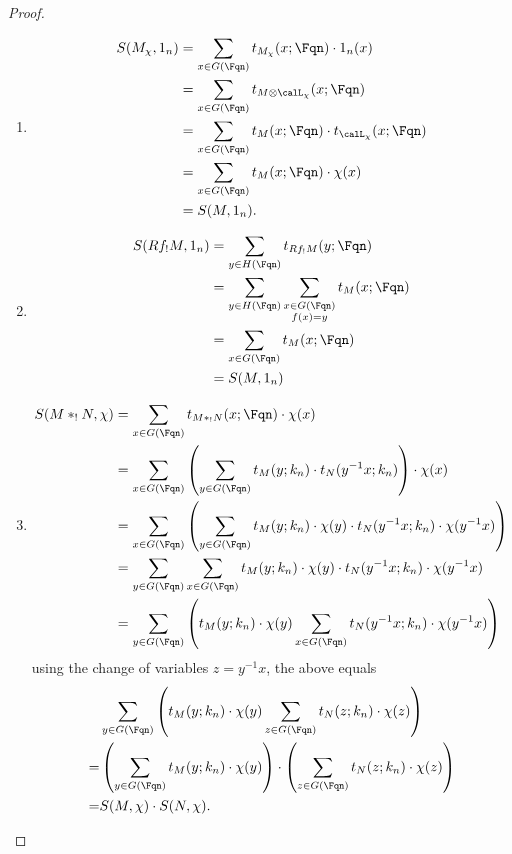 \begin{proof}
    \begin{enumerate}
        \item 
        \begin{align*}
        S(M_\chi, 1_n) &= \sum_{x \in G(\Fqn)} t_{M_\chi}(x; \Fqn) \cdot 1_n(x) \\
        &= \sum_{x \in G(\Fqn)} t_{M \otimes \calL_\chi}(x; \Fqn) \\
        &= \sum_{x \in G(\Fqn)} t_{M}(x; \Fqn) \cdot t_{\calL_\chi}(x; \Fqn)\\
        &= \sum_{x \in G(\Fqn)} t_{M}(x; \Fqn) \cdot \chi(x) \\
        &= S(M, 1_n).
        \end{align*}

        \item 
        \begin{align*}
            S(Rf_! M, 1_n) &= \sum_{y \in H(\Fqn)} t_{Rf_! M}(y; \Fqn) \\
            &= \sum_{y \in H(\Fqn)} \sum_{\substack{x \in G(\Fqn) \\ f(x) = y}} t_M(x;\Fqn) \\
            &= \sum_{x \in G(\Fqn)} t_M(x;\Fqn) \\
            &= S(M, 1_n)
        \end{align*}

        \item
        \begin{align*}
            S(M *_! N, \chi) &= \sum_{x \in G(\Fqn)} t_{M *_! N}(x;\Fqn) \cdot \chi(x)  \\
            &= \sum_{x \in G(\Fqn)} \left( \sum_{y \in G(\Fqn)} t_M(y;k_n)  \cdot t_N(y^{-1} x; k_n) \right)  \cdot \chi(x)  \\
            &= \sum_{x \in G(\Fqn)} \left( \sum_{y \in G(\Fqn)} t_M(y;k_n) \cdot \chi(y) \cdot t_N(y^{-1} x; k_n) \cdot \chi(y^{-1} x) \right)  \\
            &= \sum_{y \in G(\Fqn)} \sum_{x \in G(\Fqn)}   t_M(y;k_n) \cdot \chi(y) \cdot t_N(y^{-1} x; k_n) \cdot \chi(y^{-1} x)   \\
            &= \sum_{y \in G(\Fqn)} \left( t_M(y;k_n) \cdot \chi(y) \sum_{x \in G(\Fqn)} t_N(y^{-1} x; k_n) \cdot \chi(y^{-1} x)  \right) \\
        \end{align*}
        using the change of variables $z = y^{-1} x$, the above equals
        \begin{align*}
            & \sum_{y \in G(\Fqn)} \left( t_M(y;k_n) \cdot \chi(y) \sum_{z \in G(\Fqn)} t_N(z; k_n) \cdot \chi(z) \right)  \\
            =& \left( \sum_{y \in G(\Fqn)}  t_M(y;k_n) \cdot \chi(y) \right) \cdot \left( \sum_{z \in G(\Fqn)} t_N(z; k_n) \cdot \chi(z) \right) \\
            =& S(M, \chi) \cdot S(N,\chi).
        \end{align*}


\end{enumerate}
\end{proof}
